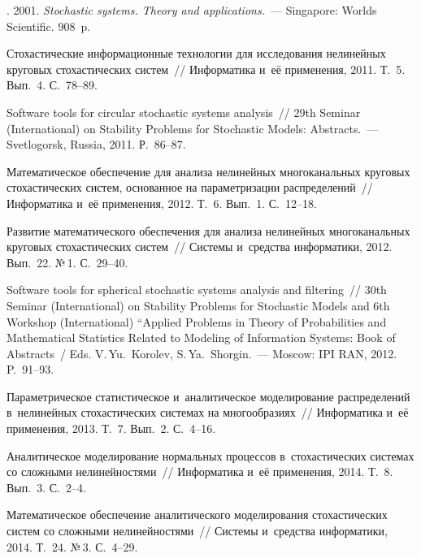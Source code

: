 \begin{multicols}{2}
{{\begin{thebibliography}{99}
. 2001.
\textit{Stochastic systems. Theory and  applications.}~---
Singapore: Worlds Scientific. 908~p.


Стохастические информационные технологии для исследования нелинейных
круговых стохастических систем~// Информатика и~её применения, 2011. Т.~5.
Вып.~4. С.~78--89.

Software tools for circular stochastic systems analysis~//
29th  Seminar (International) on Stability Problems for Stochastic Models:
Abstracts.~--- Svetlogorsk, Russia, 2011. Р.~86--87.

Математическое обеспечение для анализа нелинейных многоканальных круговых
стохастических систем, основанное на параметризации распределений~//
Информатика и~её применения, 2012. Т.~6. Вып.~1. С.~12--18.

Развитие математического обеспечения для анализа нелинейных многоканальных
круговых стохастических систем~// Системы и~средства информатики, 2012.
Вып.~22. №\,1. С.~29--40.

Software tools for spherical stochastic systems analysis and filtering~//
30th Seminar (International) on Stability Problems for Stochastic Models 
and 6th Workshop (International) ``Applied Problems in Theory of Probabilities 
and Mathematical Statistics Related to Modeling of Information Systems: 
Book of Abstracts~/ Eds. V.\,Yu.~Korolev, S.\,Ya.~Shorgin.~---
Moscow: IPI RAN, 2012. P.~91--93.

Параметрическое статистическое и~аналитическое моделирование распределений
в~нелинейных стохастических системах на многообразиях~// Информатика
и~её применения, 2013. Т.~7. Вып.~2. С.~4--16.


Аналитическое моделирование нормальных процессов в~стохастических сис\-те\-мах
со сложными нелинейностями~//  Информатика и~её применения, 2014. Т.~8.
Вып.~3. С.~2--4.


Математическое обеспечение аналитического моделирования стохастических сис\-тем
со сложными нелинейностями~// Системы и~средства информатики, 2014. Т.~24. №\,3.
С.~4--29.


\end{thebibliography}}}
\end{multicols}
